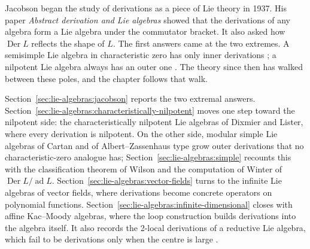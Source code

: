 Jacobson began the study of derivations as a piece of Lie theory in 1937.
His paper \emph{Abstract derivation and Lie algebras} \cite{Jacobson1937}
showed that the derivations of any algebra form a Lie algebra under the
commutator bracket.
It also asked how $\operatorname{Der} L$ reflects
the shape of $L$. The first answers came at the two extremes. A semisimple
Lie algebra in characteristic zero has only inner derivations
\cite[Theorem in \S 5.3, p.~23]{Humphreys1972}; a nilpotent Lie algebra
always has an outer one \cite[Exercise 10, p.~14]{Humphreys1972}. The
theory since then has walked between these poles, and the chapter follows
that walk.

Section~\ref{sec:lie-algebras:jacobson} reports the two extremal
answers.  Section~\ref{sec:lie-algebras:characteristically-nilpotent}
moves one step toward the nilpotent side: the characteristically nilpotent
Lie algebras of Dixmier and Lister, where every derivation is nilpotent.
On the other side, modular simple Lie algebras of Cartan and of
Albert--Zassenhaus type grow outer derivations that no characteristic-zero
analogue has; Section~\ref{sec:lie-algebras:simple} recounts this with
the classification theorem of Wilson and the computation of Winter of
$\operatorname{Der} L/\operatorname{ad} L$.  Section~\ref{sec:lie-algebras:vector-fields}
turns to the infinite Lie algebras of vector fields, where derivations
become concrete operators on polynomial functions.
Section~\ref{sec:lie-algebras:infinite-dimensional} closes with affine
Kac--Moody algebras, where the loop construction builds derivations into
the algebra itself. It also records the 2-local derivations of a reductive
Lie algebra, which fail to be derivations only when the centre is large
\cite[Corollary~1.3, p.~2]{ChenLuoXu2026}.

